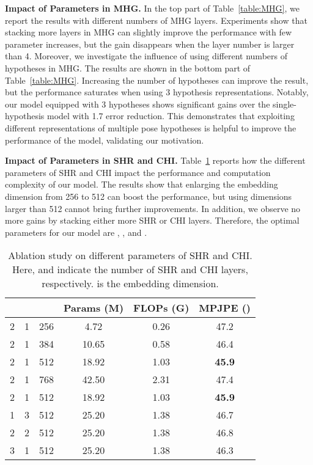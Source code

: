 \documentclass[10pt,twocolumn,letterpaper]{article}
\def\VspaceL{\vspace{-0.40cm}}
\begin{document}
\noindent
\textbf{Impact of Parameters in MHG.}
In the top part of Table~\ref{table:MHG}, we report the results with different numbers of MHG layers. 
Experiments show that stacking more layers in MHG can slightly improve the performance with few parameter increases, but the gain disappears when the layer number is larger than 4. 
Moreover, we investigate the influence of using different numbers of hypotheses in MHG. 
The results are shown in the bottom part of Table~\ref{table:MHG}. 
Increasing the number of hypotheses can improve the result, but the performance saturates when using 3 hypothesis representations. 
Notably, our model equipped with 3 hypotheses shows significant gains over the single-hypothesis model with 1.7  error reduction. 
This demonstrates that exploiting different representations of multiple pose hypotheses is helpful to improve the performance of the model, validating our motivation. 

\noindent \textbf{Impact of Parameters in SHR and CHI.}
Table~\ref{table:SHRandCHI} reports how the different parameters of SHR and CHI impact the performance and computation complexity of our model. 
The results show that enlarging the embedding dimension from 256 to 512 can boost the performance, but using dimensions larger than 512 cannot bring further improvements. 
In addition, we observe no more gains by stacking either more SHR or CHI layers. 
Therefore, the optimal parameters for our model are , , and . 

\begin{table}[tb]
  \centering  
  \footnotesize
  \caption
  {
    Ablation study on different parameters of SHR and CHI.
    Here,  and  indicate the number of SHR and CHI layers, respectively. 
     is the embedding dimension. 
  }
  \setlength{\tabcolsep}{2.35mm}  
  \begin{tabular}{cccccc}
  \toprule  [1pt]
  & &  & Params (M) &FLOPs (G) &MPJPE () \\
  \midrule [0.5pt]
  2& 1& 256& 4.72& 0.26& 47.2 \\
  2& 1& 384& 10.65& 0.58& 46.4 \\
  2& 1& 512& 18.92& 1.03& \textbf{45.9} \\
  2& 1& 768& 42.50& 2.31& 47.4 \\
  \midrule [0.5pt]

  2& 1& 512& 18.92& 1.03& \textbf{45.9} \\
  1& 3& 512& 25.20& 1.38&46.7 \\
  2& 2& 512& 25.20& 1.38& 46.8 \\
  3& 1& 512& 25.20& 1.38& 46.3 \\
  \toprule [1pt]
  \end{tabular}
  \label{table:SHRandCHI}
  \VspaceL
\end{table}
\end{document}
